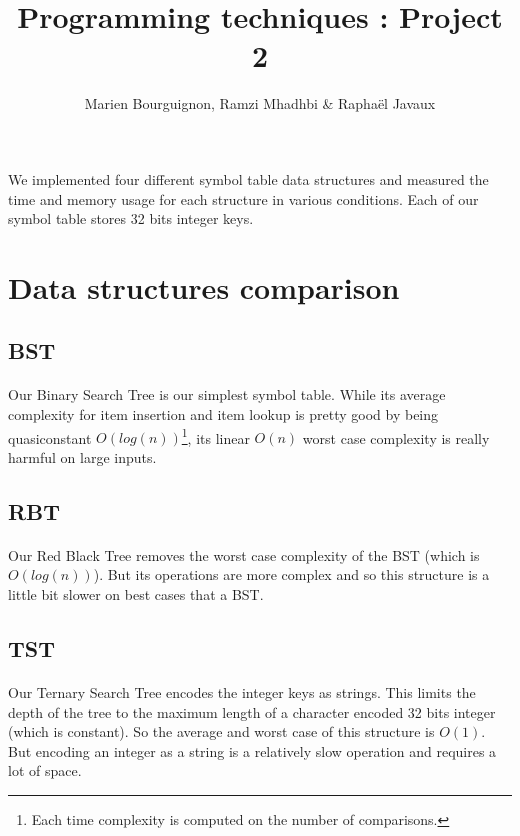 \documentclass[a4paper]{article}
\title{Programming techniques : Project 2}
\author{Marien Bourguignon, Ramzi Mhadhbi \& Raphaël Javaux}
\date{}
\begin{document}
\maketitle

    \paragraph{} We implemented four different symbol table data structures and
measured the time and memory usage for each structure in various conditions.
Each of our symbol table stores 32 bits integer keys.

\section{Data structures comparison}

\subsection{BST}

    \paragraph{} Our Binary Search Tree is our simplest symbol table. While its
average complexity for item insertion and item lookup is pretty good by being
quasiconstant $O(log(n))$\footnote{Each time complexity is computed on the
number of comparisons.}, its linear $O(n)$ worst case complexity is really
harmful on large inputs.

\subsection{RBT}

    \paragraph{} Our Red Black Tree removes the worst case complexity of the
BST (which is $O(log(n))$). But its operations are more complex and so this
structure is a little bit slower on best cases that a BST.

\subsection{TST}

    \paragraph{} Our Ternary Search Tree encodes the integer keys as strings.
This limits the depth of the tree to the maximum length of a character encoded
32 bits integer (which is constant). So the average and worst case of this 
structure is $O(1)$. But encoding an integer as a string is a relatively slow 
operation and requires a lot of space.
\end{document}
